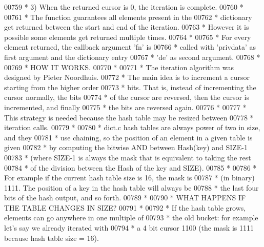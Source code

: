 \begin{DoxyCode}
00759 \textcolor{comment}{ * 3) When the returned cursor is 0, the iteration is complete.}
00760 \textcolor{comment}{ *}
00761 \textcolor{comment}{ * The function guarantees all elements present in the}
00762 \textcolor{comment}{ * dictionary get returned between the start and end of the iteration.}
00763 \textcolor{comment}{ * However it is possible some elements get returned multiple times.}
00764 \textcolor{comment}{ *}
00765 \textcolor{comment}{ * For every element returned, the callback argument 'fn' is}
00766 \textcolor{comment}{ * called with 'privdata' as first argument and the dictionary entry}
00767 \textcolor{comment}{ * 'de' as second argument.}
00768 \textcolor{comment}{ *}
00769 \textcolor{comment}{ * HOW IT WORKS.}
00770 \textcolor{comment}{ *}
00771 \textcolor{comment}{ * The iteration algorithm was designed by Pieter Noordhuis.}
00772 \textcolor{comment}{ * The main idea is to increment a cursor starting from the higher order}
00773 \textcolor{comment}{ * bits. That is, instead of incrementing the cursor normally, the bits}
00774 \textcolor{comment}{ * of the cursor are reversed, then the cursor is incremented, and finally}
00775 \textcolor{comment}{ * the bits are reversed again.}
00776 \textcolor{comment}{ *}
00777 \textcolor{comment}{ * This strategy is needed because the hash table may be resized between}
00778 \textcolor{comment}{ * iteration calls.}
00779 \textcolor{comment}{ *}
00780 \textcolor{comment}{ * dict.c hash tables are always power of two in size, and they}
00781 \textcolor{comment}{ * use chaining, so the position of an element in a given table is given}
00782 \textcolor{comment}{ * by computing the bitwise AND between Hash(key) and SIZE-1}
00783 \textcolor{comment}{ * (where SIZE-1 is always the mask that is equivalent to taking the rest}
00784 \textcolor{comment}{ *  of the division between the Hash of the key and SIZE).}
00785 \textcolor{comment}{ *}
00786 \textcolor{comment}{ * For example if the current hash table size is 16, the mask is}
00787 \textcolor{comment}{ * (in binary) 1111. The position of a key in the hash table will always be}
00788 \textcolor{comment}{ * the last four bits of the hash output, and so forth.}
00789 \textcolor{comment}{ *}
00790 \textcolor{comment}{ * WHAT HAPPENS IF THE TABLE CHANGES IN SIZE?}
00791 \textcolor{comment}{ *}
00792 \textcolor{comment}{ * If the hash table grows, elements can go anywhere in one multiple of}
00793 \textcolor{comment}{ * the old bucket: for example let's say we already iterated with}
00794 \textcolor{comment}{ * a 4 bit cursor 1100 (the mask is 1111 because hash table size = 16).}

\end{DoxyCode}
